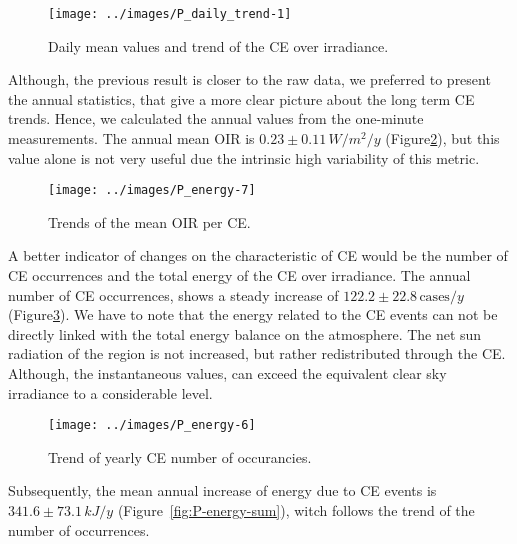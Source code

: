 \documentclass[
]{article}
\begin{document}
\begin{figure}[h!]

{\centering \texttt{[image: ../images/P\_daily\_trend-1]} 

}

\caption{Daily mean values and trend of the CE over irradiance.}\label{fig:CEmeanDaily}
\end{figure}

Although, the previous result is closer to the raw data, we preferred to present the
annual statistics, that give a more clear picture about the long term CE trends.
Hence, we calculated the annual values from the one-minute measurements. The annual
mean OIR is
\(0.23\pm 0.11\,W/m^2/y\)
(Figure\nobreakspace{}\ref{fig:P-energy-mean}),
but this value alone is not very useful due the intrinsic high variability of this
metric.

\begin{figure}[h!]

{\centering \texttt{[image: ../images/P\_energy-7]} 

}

\caption{Trends of the mean OIR per CE.}\label{fig:P-energy-mean}
\end{figure}

A better indicator of changes on the characteristic of CE would be the number of CE
occurrences and the total energy of the CE over irradiance. The annual number of CE
occurrences, shows a steady increase of
\(122.2\pm 22.8\,\text{cases}/y\)
(Figure\nobreakspace{}\ref{fig:P-energy-N}).
We have to note that the energy related to the CE events can not be directly linked
with the total energy balance on the atmosphere. The net sun radiation of the region
is not increased, but rather redistributed through the CE. Although, the
instantaneous values, can exceed the equivalent clear sky irradiance to a
considerable level.

\begin{figure}[h!]

{\centering \texttt{[image: ../images/P\_energy-6]} 

}

\caption{Trend of yearly CE number of occurancies.}\label{fig:P-energy-N}
\end{figure}

Subsequently, the mean annual increase of energy due to CE events is
\(341.6\pm 73.1\,kJ/y\)
(Figure~\ref{fig:P-energy-sum}), witch follows the trend of the number of
occurrences.
\end{document}
